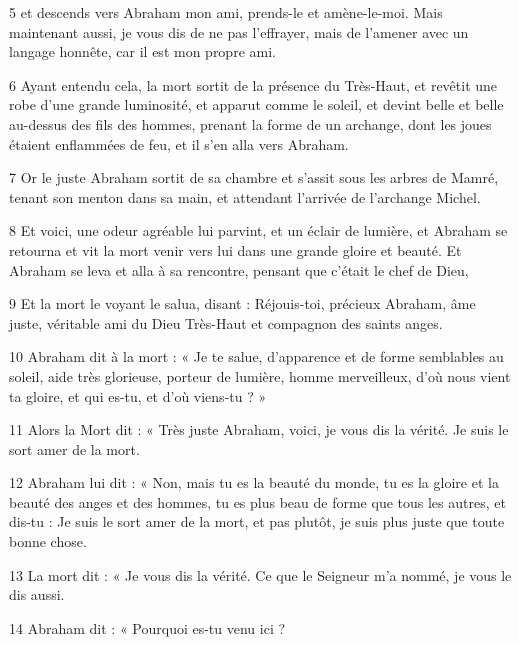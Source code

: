 \par 5 et descends vers Abraham mon ami, prends-le et amène-le-moi. Mais maintenant aussi, je vous dis de ne pas l'effrayer, mais de l'amener avec un langage honnête, car il est mon propre ami.

\par 6 Ayant entendu cela, la mort sortit de la présence du Très-Haut, et revêtit une robe d'une grande luminosité, et apparut comme le soleil, et devint belle et belle au-dessus des fils des hommes, prenant la forme de un archange, dont les joues étaient enflammées de feu, et il s'en alla vers Abraham.

\par 7 Or le juste Abraham sortit de sa chambre et s'assit sous les arbres de Mamré, tenant son menton dans sa main, et attendant l'arrivée de l'archange Michel.

\par 8 Et voici, une odeur agréable lui parvint, et un éclair de lumière, et Abraham se retourna et vit la mort venir vers lui dans une grande gloire et beauté. Et Abraham se leva et alla à sa rencontre, pensant que c'était le chef de Dieu,

\par 9 Et la mort le voyant le salua, disant : Réjouis-toi, précieux Abraham, âme juste, véritable ami du Dieu Très-Haut et compagnon des saints anges.

\par 10 Abraham dit à la mort : « Je te salue, d'apparence et de forme semblables au soleil, aide très glorieuse, porteur de lumière, homme merveilleux, d'où nous vient ta gloire, et qui es-tu, et d'où viens-tu ? »

\par 11 Alors la Mort dit : « Très juste Abraham, voici, je vous dis la vérité. Je suis le sort amer de la mort.

\par 12 Abraham lui dit : « Non, mais tu es la beauté du monde, tu es la gloire et la beauté des anges et des hommes, tu es plus beau de forme que tous les autres, et dis-tu : Je suis le sort amer de la mort, et pas plutôt, je suis plus juste que toute bonne chose.

\par 13 La mort dit : « Je vous dis la vérité. Ce que le Seigneur m’a nommé, je vous le dis aussi.

\par 14 Abraham dit : « Pourquoi es-tu venu ici ?

